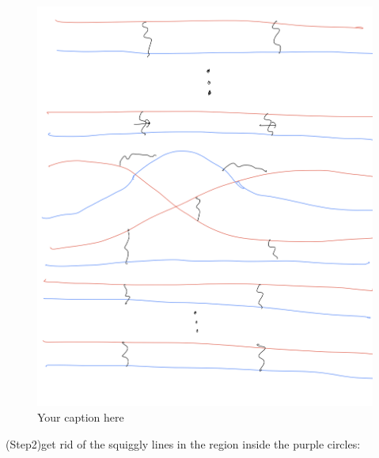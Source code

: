 \begin{figure}[H] %
    \centering
    \includegraphics[width=\linewidth]{diagrams/definition12/4.png} %
    \caption{Your caption here}
    \label{fig:your-label}
\end{figure}

(Step2)get rid of the squiggly lines in the region inside the purple circles:

